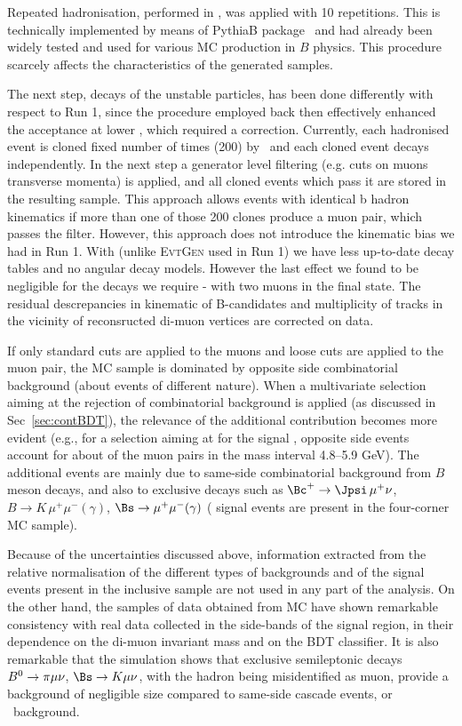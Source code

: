 Repeated hadronisation, performed in \Pythia, was applied with 10 repetitions. 
This is technically implemented by means of PythiaB
package~\cite{PythiaB} and had already been widely tested and used for various MC
production in $B$ physics. This procedure scarcely affects the characteristics of
the generated samples. 

The next step, decays of the unstable particles, has been done differently with respect to Run 1,
since the procedure employed back then effectively enhanced the acceptance at lower \pT, which
required a correction. Currently, each hadronised event is cloned fixed number of times (200) by \Pythia~and each cloned event
decays independently. In the next step a generator level filtering (e.g. cuts on muons transverse momenta) is applied, 
and all cloned events which pass it are stored in the resulting sample. 
This approach allows events with identical b hadron kinematics if more than one of those 200 
clones produce a muon pair, which passes the filter. 
However, this approach does not introduce the kinematic bias we had in Run 1. With
\Pythia (unlike \textsc{EvtGen} used in Run 1) we have less up-to-date decay tables 
and no angular decay models. However the last 
effect we found to be negligible for the decays we require - with two muons in the final state.
The residual descrepancies in kinematic of B-candidates and multiplicity of tracks in the vicinity
of reconsructed di-muon vertices are corrected on data.

If only standard cuts are applied to the
muons and loose cuts are applied to the muon pair, the MC sample is dominated
by opposite side combinatorial background (about  events of different nature). When a multivariate selection
aiming at the rejection of combinatorial background is applied  (as discussed
in Sec~\ref{sec:contBDT}), the relevance of the additional contribution becomes
more evident (e.g., for a selection aiming at  for the signal
\Bsmumu, opposite side events account for about  of the muon pairs
in the mass interval 4.8--5.9 GeV). The additional events are mainly due to
same-side combinatorial  background from $B$ meson decays, and also to exclusive
decays such as $\Bc^+ \to \Jpsi \, \mu^+ \nu$, $B \to K \, \mu^+\mu^- (\gamma)$,
$\Bs \to \mu^+ \mu^-(\gamma)$  ( signal events are present in the four-corner
MC sample).


Because of the uncertainties discussed above, information extracted from the relative
normalisation of the different types of backgrounds and of the signal events present
in the inclusive sample are not used in any part of the analysis.
On the other hand, the samples of data obtained from MC have shown
remarkable consistency with real data collected in the side-bands of the
signal region, in their dependence on the di-muon invariant mass and on
the BDT classifier.
It is also remarkable that the simulation shows that exclusive
semileptonic decays $B^0 \to \pi\mu\nu$, $\Bs \to K\mu\nu$, with the hadron being
misidentified as muon, provide a background of negligible size
compared to same-side cascade events, or \Bc\ background. 


